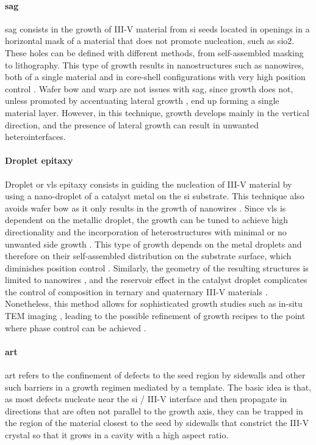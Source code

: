 \paragraph{\Acf{sag}} \acs{sag} consists in the growth of III-V material from \acl{si} seeds located in openings in a horizontal mask of a material that does not promote nucleation, such as \acs{sio2}. These holes can be defined with different methods, from self-assembled masking to lithography. This type of growth results in nanostructures \cite{Cantoro2012} such as nanowires, both of a single material and in core-shell configurations with very high position control \cite{Tomioka2011}. Wafer bow and warp are not issues with \acs{sag}, since growth does not, unless promoted by accentuating lateral growth \cite{McKenzie2023}, end up forming a single material layer. However, in this technique, growth develops mainly in the vertical direction, and the presence of lateral growth can result in unwanted heterointerfaces.
\par
\paragraph{Droplet epitaxy} Droplet or \acf{vls} epitaxy consists in guiding the nucleation of III-V material by using a nano-droplet of a catalyst metal on the \acl{si} substrate. This technique also avoids wafer bow as it only results in the growth of nanowires \cite{Wagner1964}. Since \acs{vls} is dependent on the metallic droplet, the growth can be tuned to achieve high directionality and the incorporation of heterostructures with minimal or no unwanted side growth \cite{Harmand2018, Joyce2007}. This type of growth depends on the metal droplets and therefore on their self-assembled distribution on the substrate surface, which diminishes position control \cite{Joyce2007}. Similarly, the geometry of the resulting structures is limited to nanowires \cite{Wagner1964}, and the reservoir effect in the catalyst droplet complicates the control of composition in ternary and quaternary III-V materials \cite{Dubrovskii2017}. Nonetheless, this method allows for sophisticated growth studies such as in-situ TEM imaging \cite{Maliakkal2020, Jacobsson2016, Harmand2018}, leading to the possible refinement of growth recipes to the point where phase control can be achieved \cite{Algra2008, Caroff2009, Joyce2007}.
\par
\paragraph{\Acf{art}} \acs{art} refers to the confinement of defects to the seed region by sidewalls and other such barriers in a growth regimen mediated by a template. The basic idea is that, as most defects nucleate near the \acl{si} / III-V interface and then propagate in directions that are often not parallel to the growth axis, they can be trapped in the region of the material closest to the seed by sidewalls that constrict the III-V crystal so that it grows in a cavity with a high aspect ratio. 

